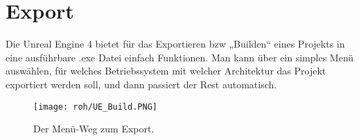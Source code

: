\section{Export}
Die Unreal Engine 4 bietet für das Exportieren bzw „Builden“ eines Projekts in eine ausführbare .exe Datei einfach Funktionen. Man kann über ein simples Menü auswählen, für welches Betriebssystem mit welcher Architektur das Projekt exportiert werden soll, und dann passiert der Rest automatisch.\citep{ue:Export}
\begin{figure}[H]
    \centering
    \texttt{[image: roh/UE\_Build.PNG]}
    \caption{Der Menü-Weg zum Export.}
    \label{UE:Build}
\end{figure}